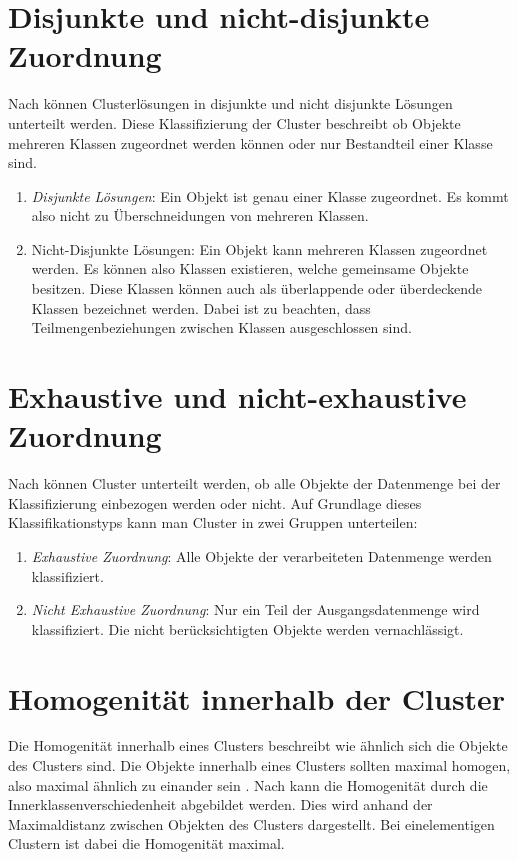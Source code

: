 \section{Disjunkte und nicht-disjunkte Zuordnung}
Nach \citet[S. 175]{Bankhofer.2008} können Clusterlösungen in disjunkte und nicht disjunkte Lösungen unterteilt werden. Diese Klassifizierung der Cluster beschreibt ob Objekte mehreren Klassen zugeordnet werden können oder nur Bestandteil einer Klasse sind.
\begin{enumerate}
    \item \textit{Disjunkte Lösungen}: Ein Objekt ist genau einer Klasse zugeordnet. Es kommt also nicht zu Überschneidungen von mehreren Klassen.
    \item {Nicht-Disjunkte Lösungen}: Ein Objekt kann mehreren Klassen zugeordnet werden. Es können also Klassen existieren, welche gemeinsame Objekte besitzen. Diese Klassen können auch als überlappende oder überdeckende Klassen bezeichnet werden. Dabei ist zu beachten, dass Teilmengenbeziehungen zwischen Klassen ausgeschlossen sind.
\end{enumerate}

\section{Exhaustive und nicht-exhaustive Zuordnung}
Nach \citet[S. 174]{Bankhofer.2008} können Cluster unterteilt werden, ob alle Objekte der Datenmenge bei der Klassifizierung einbezogen werden oder nicht. Auf Grundlage dieses Klassifikationstyps kann man Cluster in zwei Gruppen unterteilen:
\begin{enumerate}
    \item \textit{Exhaustive Zuordnung}: Alle Objekte der verarbeiteten Datenmenge werden klassifiziert.
    \item \textit{Nicht Exhaustive Zuordnung}: Nur ein Teil der Ausgangsdatenmenge wird klassifiziert. Die nicht berücksichtigten Objekte werden vernachlässigt.
\end{enumerate}

\section{Homogenität innerhalb der Cluster}
Die Homogenität innerhalb eines Clusters beschreibt wie ähnlich sich die Objekte des Clusters sind. Die Objekte innerhalb eines Clusters sollten maximal homogen, also maximal ähnlich zu einander sein \citep[Vgl.][S. 16]{Bacher.2010}.
Nach \citet[S. 181]{Bankhofer.2008} kann die Homogenität durch die Innerklassenverschiedenheit abgebildet werden. Dies wird anhand der Maximaldistanz zwischen Objekten des Clusters dargestellt. Bei einelementigen Clustern ist dabei die Homogenität maximal.

